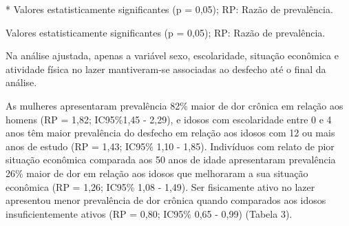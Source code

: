 \documentclass{article}
\begin{document}
*
Valores estatisticamente significantes (p = 0,05); RP: Razão de prevalência.

Valores estatisticamente significantes (p = 0,05); RP: Razão de prevalência.

Na análise ajustada, apenas a variável sexo, escolaridade, situação econômica e
atividade física no lazer mantiveram-se associadas ao desfecho até o final da
análise.

As mulheres apresentaram prevalência 82\% maior de dor crônica em relação aos
homens (RP = 1,82; IC95\%1,45 - 2,29), e idosos com escolaridade entre 0 e 4
anos têm maior prevalência do desfecho em relação aos idosos com 12 ou mais anos
de estudo (RP = 1,43; IC95\% 1,10 - 1,85). Indivíduos com relato de pior
situação econômica comparada aos 50 anos de idade apresentaram prevalência 26\%
maior de dor em relação aos idosos que melhoraram a sua situação econômica (RP =
1,26; IC95\% 1,08 - 1,49). Ser fisicamente ativo no lazer apresentou menor
prevalência de dor crônica quando comparados aos idosos insuficientemente ativos
(RP = 0,80; IC95\% 0,65 - 0,99) (Tabela 3).
\end{document}
